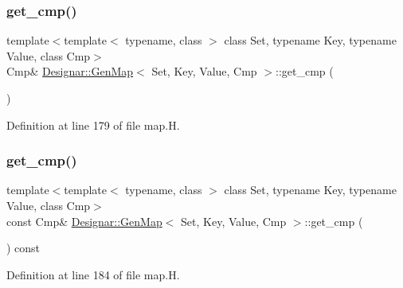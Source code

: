 \subsubsection{\texorpdfstring{get\+\_\+cmp()}{get\_cmp()}\hspace{0.1cm}{\footnotesize\ttfamily [1/2]}}
{\footnotesize\ttfamily template$<$template$<$ typename, class $>$ class Set, typename Key, typename Value, class Cmp$>$ \\
Cmp\& \hyperlink{class_designar_1_1_gen_map}{Designar\+::\+Gen\+Map}$<$ Set, Key, Value, Cmp $>$\+::get\+\_\+cmp (\begin{DoxyParamCaption}{ }\end{DoxyParamCaption})\hspace{0.3cm}{\ttfamily [inline]}}



Definition at line 179 of file map.\+H.

\mbox{\label{class_designar_1_1_gen_map_a81de02316324ed11c8a668fe2d35d2d3}} 
\subsubsection{\texorpdfstring{get\+\_\+cmp()}{get\_cmp()}\hspace{0.1cm}{\footnotesize\ttfamily [2/2]}}
{\footnotesize\ttfamily template$<$template$<$ typename, class $>$ class Set, typename Key, typename Value, class Cmp$>$ \\
const Cmp\& \hyperlink{class_designar_1_1_gen_map}{Designar\+::\+Gen\+Map}$<$ Set, Key, Value, Cmp $>$\+::get\+\_\+cmp (\begin{DoxyParamCaption}{ }\end{DoxyParamCaption}) const\hspace{0.3cm}{\ttfamily [inline]}}



Definition at line 184 of file map.\+H.

\mbox{\label{class_designar_1_1_gen_map_aaecc59b3f9c206d0d962bd1cd6bfc4d6}} 
